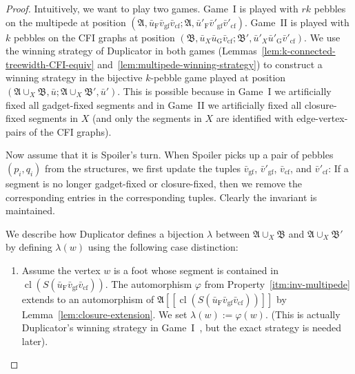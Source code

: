 \documentclass[]{lmcs}
\renewcommand{\phi}{\varphi}
\newcommand{\autoA}{\phi}
\newcommand{\tup}[1]{\bar{#1}}
\newcommand{\vertA}{u}
\newcommand{\vertB}{v}
\newcommand{\vertC}{w}
\newcommand{\StructA}{\mathfrak{A}}
\newcommand{\StructB}{\mathfrak{B}}
\newcommand{\gamebij}{\lambda}
\newcommand{\footbset}{X}
\newcommand{\footbsetA}{X}
\newcommand{\closure}[1]{\operatorname{cl}(#1)}
\newcommand{\gluing}[3]{#1 \cup_#2 #3}
\newcommand{\footinduced}[2]{#1[[#2]]}
\newcommand{\segmentOf}[1]{S(#1)}
\newcommand{\feetrestrict}[2]{#1_{#2}}
\newcommand{\gadgetrestrict}[1]{#1_{\text{G}}}
\newcommand{\nongadgetrestrict}[1]{#1_{\text{F}}}
\newcommand{\gadgetfixed}[1]{#1_{\text{gf}}}
\newcommand{\closurefixed}[1]{#1_{\text{cf}}}
\begin{document}
\begin{proof}
	Intuitively, we want to play two games.
	Game~I is played with $rk$ pebbles on the multipede at position
	$(\StructA, \nongadgetrestrict{\tup{\vertA}}\gadgetfixed{\tup{\vertB}}\closurefixed{\tup{\vertB}}; \StructA, \nongadgetrestrict{\tup{\vertA}'}\gadgetfixed{\tup{\vertB}'}\closurefixed{\tup{\vertB}'})$.
	Game~II is played with $k$ pebbles on the CFI graphs at position
	$(\StructB,\feetrestrict{\tup{\vertA}}{\footbsetA}\gadgetrestrict{\tup{\vertA}}\closurefixed{\tup{\vertB}}; \StructB', \feetrestrict{\tup{\vertA}'}{\footbsetA}\gadgetrestrict{\tup{\vertA}'}\closurefixed{\tup{\vertB}'})$.
	We use the winning strategy of Duplicator in both games
	(Lemmas~\ref{lem:k-connected-treewidth-CFI-equiv} and~\ref{lem:multipede-winning-strategy}) to construct
	a winning strategy in the bijective $k$-pebble game played at position 
	$(\gluing{\StructA}{\footbset}{\StructB}, \tup{\vertA}; \gluing{\StructA}{\footbset}{\StructB'}, \tup{\vertA}')$.
	This is possible because in Game~I we artificially fixed all gadget-fixed segments
	and in Game~II we artificially fixed all closure-fixed segments in $\footbsetA$ (and only the segments in $\footbsetA$ are identified with edge-vertex-pairs of the CFI graphs).
	
	
	
	Now assume that it is Spoiler's turn.
	When Spoiler picks up a pair of pebbles $(p_i,q_i)$ from the structures,
	we first update the tuples $\gadgetfixed{\tup{\vertB}}$, $\gadgetfixed{\tup{\vertB}'}$, $\closurefixed{\tup{\vertB}}$, and $\closurefixed{\tup{\vertB}'}$:
	If a segment is no longer gadget-fixed or closure-fixed,
	then we remove the corresponding entries in the corresponding tuples.
	Clearly the invariant is maintained.
	
	We describe how Duplicator defines a bijection $\gamebij$ between
	$\gluing{\StructA}{\footbsetA}{\StructB}$ and $\gluing{\StructA}{\footbsetA}{\StructB'}$
	by defining $\gamebij(\vertC)$ using the following case distinction:
	\begin{enumerate}[label=(\alph*)]
		\item Assume the vertex $\vertC$ is a foot whose segment is contained in $\closure{\segmentOf{\nongadgetrestrict{\tup{\vertA}}\gadgetfixed{\tup{\vertB}}\closurefixed{\tup{\vertB}}}}$.
		The automorphism $\autoA$ from Property~\ref{itm:inv-multipede} extends to an automorphism of $\footinduced{\StructA}{\closure{\segmentOf{\nongadgetrestrict{\tup{\vertA}}\gadgetfixed{\tup{\vertB}}\closurefixed{\tup{\vertB}}}}}$
		by Lemma~\ref{lem:closure-extension}.
		We set $\gamebij(\vertC) := \autoA(\vertC)$.
		(This is actually Duplicator's winning strategy in Game~I~\cite{GurevichShelah96},
		but the exact strategy is needed later).
		 

\end{enumerate}
\end{proof}
\end{document}
